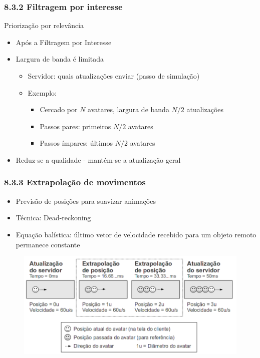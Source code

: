 \documentclass{beamer}
\begin{document}
\begin{frame}{}
  \frametitle{8.3.2 Filtragem por interesse}
  Priorização por relevância
    \begin{itemize}
      \item Após a Filtragem por Interesse
      \item Largura de banda é limitada
      \begin{itemize}
          \item Servidor: quais atualizações enviar (passo de simulação)
          \item Exemplo: 
          \begin{itemize}
              \item Cercado por $N$ avatares, largura de banda $N/2$ atualizações
              \item Passos pares: primeiros $N/2$ avatares
              \item Passos ímpares: últimos $N/2$ avatares
          \end{itemize}
      \end{itemize}
      \item Reduz-se a qualidade - mantém-se a atualização geral
    \end{itemize}
\end{frame}

\begin{frame}
  \frametitle{8.3.3 Extrapolação de movimentos}
  \begin{itemize}
    \item Previsão de posições para suavizar animações
    \item Técnica: Dead-reckoning
    \item Equação balística: último vetor de velocidade recebido para um objeto remoto permanece constante
  \end{itemize}
  \begin{figure}[h]
    \centering
    \vspace{-18pt}
    \includegraphics[width=1.03\textwidth]{imagem_83.png}
    \vspace{-20pt}
  \end{figure}
\end{frame}
\end{document}
